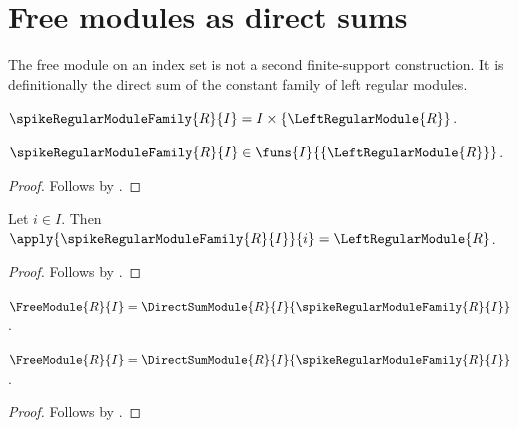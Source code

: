 




\section{Free modules as direct sums}

The free module on an index set is not a second finite-support construction.
It is definitionally the direct sum of the constant family of left regular
modules.

\begin{definition}\label{spike_regular_module_family}
    $\spikeRegularModuleFamily{R}{I}
        =I\times\{\LeftRegularModule{R}\}$.
\end{definition}

\begin{proposition}\label{spike_regular_module_family_type}
    $\spikeRegularModuleFamily{R}{I}\in
        \funs{I}{\{\LeftRegularModule{R}\}}$.
\end{proposition}
\begin{proof}
    Follows by
        .
\end{proof}

\begin{proposition}\label{spike_regular_module_family_apply}
    Let $i\in I$.
    Then
        $\apply{\spikeRegularModuleFamily{R}{I}}{i}
            =\LeftRegularModule{R}$.
\end{proposition}
\begin{proof}
    Follows by
        .
\end{proof}

\begin{definition}\label{spike_free_module}
    $\FreeModule{R}{I}
        =\DirectSumModule{R}{I}{\spikeRegularModuleFamily{R}{I}}$.
\end{definition}

\begin{theorem}\label{spike_free_module_constructor_eq}
    $\FreeModule{R}{I}
        =\DirectSumModule{R}{I}{\spikeRegularModuleFamily{R}{I}}$.
\end{theorem}
\begin{proof}
    Follows by .
\end{proof}

